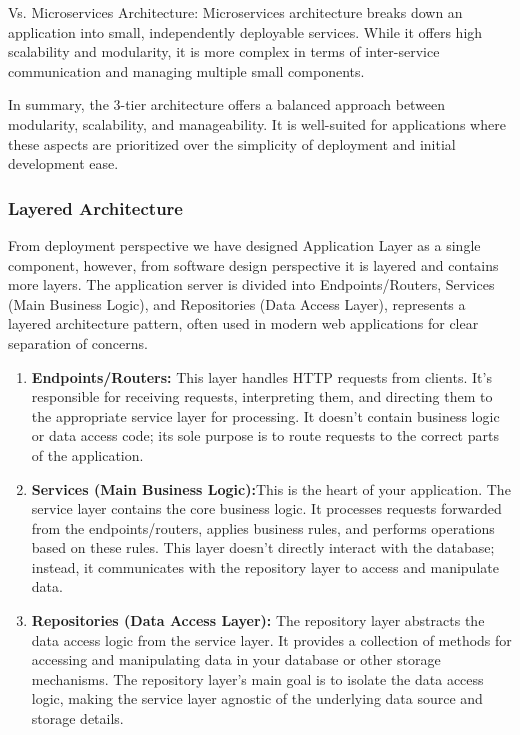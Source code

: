 Vs. Microservices Architecture: Microservices architecture breaks down an application into small, independently deployable services. While it offers high scalability and modularity, it is more complex in terms of inter-service communication and managing multiple small components.

In summary, the 3-tier architecture offers a balanced approach between modularity, scalability, and manageability. It is well-suited for applications where these aspects are prioritized over the simplicity of deployment and initial development ease.


\subsubsection{Layered Architecture}
From deployment perspective we have designed Application Layer as a single component, however, from software design perspective it is layered and contains more layers. The application server is divided into Endpoints/Routers, Services (Main Business Logic), and Repositories (Data Access Layer), represents a layered architecture pattern, often used in modern web applications for clear separation of concerns. \\
\begin{enumerate}
\item \textbf{Endpoints/Routers:} This layer handles HTTP requests from clients. It's responsible for receiving requests, interpreting them, and directing them to the appropriate service layer for processing. It doesn't contain business logic or data access code; its sole purpose is to route requests to the correct parts of the application.

\item \textbf{Services (Main Business Logic):}This is the heart of your application. The service layer contains the core business logic. It processes requests forwarded from the endpoints/routers, applies business rules, and performs operations based on these rules. This layer doesn't directly interact with the database; instead, it communicates with the repository layer to access and manipulate data.

\item \textbf{Repositories (Data Access Layer): }The repository layer abstracts the data access logic from the service layer. It provides a collection of methods for accessing and manipulating data in your database or other storage mechanisms. The repository layer's main goal is to isolate the data access logic, making the service layer agnostic of the underlying data source and storage details.
\end{enumerate}

